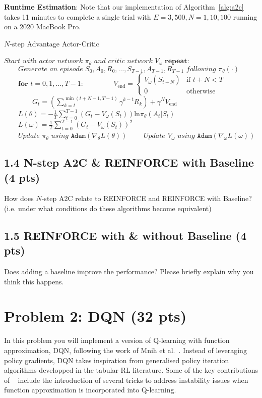 \documentclass[12pt]{article}
\begin{document}
\textbf{Runtime Estimation}: Note that our implementation of Algorithm~\ref{alg:a2c} takes 11 minutes to complete a single trial with $E=3,500, N=1,10,100$ running on a 2020 MacBook Pro.

\begin{algorithm}
\caption{$N$-step Advantage Actor-Critic\label{alg:a2c}}
\begin{algorithmic}[1]
\State $\textit{Start with actor network } \pi_\theta \textit{ and critic network } V_{\omega}$
\State $\textbf{repeat:}$
\State $\qquad\textit{Generate an episode } S_0, A_0, R_0, \ldots, S_{T-1}, A_{T-1}, R_{T-1} \textit{ following } \pi_\theta(\cdot)$
\State $\qquad\textbf{for } t =0, 1, \dots , T-1 $: \label{line:a2c:1}
\State $\qquad\qquad V_{\text{end}} = 
\begin{cases} 
V_{\omega}(S_{t+N}) & \text{if } t + N < T
\\
0 & \text{otherwise}
\end{cases}$ \label{line:a2c:2}
\State $\qquad\qquad G_t = \left(\sum_{k=t}^{\min(t + N - 1, T-1)} \gamma^{k-t} R_{k}\right) + \gamma^N V_{\text{end}} $ \label{line:a2c:3}
\State $\qquad L(\theta) = -\frac{1}{T} \sum_{t=0}^{T-1} (G_t - V_{\omega}(S_t)) \text{ln} \pi_\theta(A_t | S_t)$
\State $\qquad L(\omega) = \frac{1}{T} \sum_{t=0}^{T-1} (G_t - V_{\omega}(S_t))^2 $
\State $\qquad\textit{Update $\pi_\theta$ using } \texttt{Adam}\left(\nabla_\theta L(\theta)\right)$
\State $\qquad\textit{Update $V_\omega$ using } \texttt{Adam}\left(\nabla_\omega L(\omega)\right)$
\EndProcedure
\end{algorithmic}
\label{alg:REINFORCE}
\end{algorithm}




\subsection*{1.4 N-step A2C \& REINFORCE with Baseline (4 pts)}
How does $N$-step A2C relate to REINFORCE and REINFORCE with Baseline? (i.e. under what conditions do these algorithms become equivalent)

\subsection*{1.5 REINFORCE with \& without Baseline (4 pts)}
Does adding a baseline improve the performance? Please briefly explain why you think this happens.

\newpage
\section*{Problem 2: DQN (32 pts)}
In this problem you will implement a version of Q-learning with function approximation, DQN, following the work of Mnih et al.~\cite{mnih2015human}. Instead of leveraging policy gradients, DQN takes inspiration from generalised policy iteration algorithms developped in the tabular RL literature. Some of the key contributions of ~\cite{mnih2015human} include the introduction of several tricks to address instability issues when function approximation is incorporated into Q-learning. 
\end{document}
